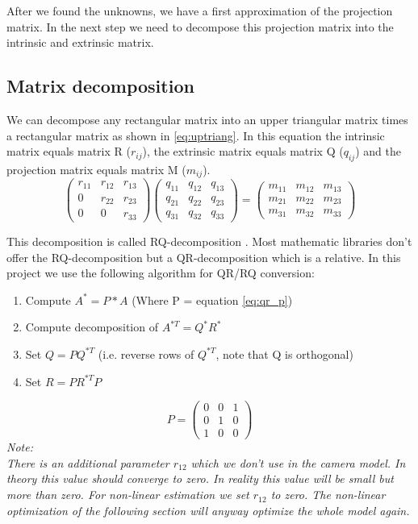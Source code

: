\documentclass[11pt,a4paper,titlepage,oneside]{report}
\begin{document}
After we found the unknowns, we have a first approximation of the projection matrix. In the next step we need to decompose this projection matrix into the intrinsic and extrinsic matrix.\\

\subsection{Matrix decomposition}\label{sec:matrix_dec}
We can decompose any rectangular matrix into an upper triangular matrix times a rectangular matrix as shown in \ref{eq:uptriang}. In this equation the intrinsic matrix equals matrix R ($r_{ij}$), the extrinsic matrix equals matrix Q ($q_{ij}$) and the projection matrix equals matrix M ($m_{ij}$).
\begin{equation}\label{eq:uptriang}
	\begin{pmatrix}
		r_{11} & r_{12} & r_{13}\\
		0 & r_{22} & r_{23}\\
		0 & 0 & r_{33}
	\end{pmatrix}
	\begin{pmatrix}
		q_{11} & q_{12} & q_{13}\\
		q_{21} & q_{22} & q_{23}\\
		q_{31} & q_{32} & q_{33}
	\end{pmatrix}=
	\begin{pmatrix}
		m_{11} & m_{12} & m_{13}\\
		m_{21} & m_{22} & m_{23}\\
		m_{31} & m_{32} & m_{33}
	\end{pmatrix}
\end{equation}

This decomposition is called RQ-decomposition \cite{qr_decomposition}. Most mathematic libraries don't offer the RQ-decomposition but a QR-decomposition which is a relative. In this project we use the following algorithm \cite{rq_stack} for QR/RQ conversion:
\begin{enumerate}
	\item Compute $A^{*}=P*A$ (Where P = equation \ref{eq:qr_p})
	\item Compute decomposition of $A^{*T}=Q^*R^*$
	\item Set $Q=PQ^{*T}$ (i.e. reverse rows of $Q^{*T}$, note that Q is orthogonal)
	\item Set $R=PR^{*T}P$
\end{enumerate}

\begin{equation}\label{eq:qr_p}
	P=\begin{pmatrix}
		0 & 0 & 1\\
		0 & 1 & 0\\
		1 & 0 & 0
	\end{pmatrix}
\end{equation}
\em
Note:\\
There is an additional parameter $r_{12}$ which we don't use in the camera model. In theory this value should converge to zero. In reality this value will be small but more than zero. For non-linear estimation we set $r_{12}$ to zero. The non-linear optimization of the following section will anyway optimize the whole model again.
\normalfont
\end{document}
